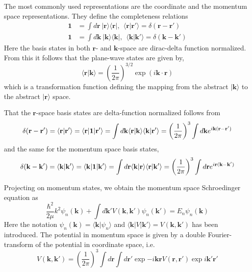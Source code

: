 \documentclass[%
oneside,                 %
final,                   %
10pt]{article}
\begin{document}
The most commonly used representations are the coordinate and
the momentum space representations. They define the completeness relations 
\begin{align*}
 \mathbf{1}&=  \int d\mathbf{r} \:\vert\mathbf{r} \rangle \langle \mathbf{r}\vert, \:\: \langle  \mathbf{r}\vert  \mathbf{r'} \rangle = \delta ( \mathbf{r}-\mathbf{r'}) \\
\mathbf{1} &= \int d\mathbf{k} \:\vert  \mathbf{k}\rangle \langle \mathbf{k}\vert, \:\: \langle\mathbf{k}\vert  \mathbf{k'} \rangle = \delta ( \mathbf{k}-\mathbf{k'}) 
\end{align*}
Here the basis states in  both $\mathbf{r}$- and $\mathbf{k}$-space are dirac-delta 
function normalized. From this it follows that the plane-wave states are given by,
\[
\langle\mathbf{r}\vert\mathbf{k} \rangle =\left(\frac{1}{2\pi}\right)^{3/2}\exp\left(i\mathbf{k\cdot r} \right)
\]
which is a transformation function defining the mapping from the abstract 
$\vert\mathbf{k}\rangle$ to the abstract $\vert\mathbf{r}\rangle $ space.

That the $\mathbf{r}$-space basis states are 
delta-function normalized follows from 
\[
\delta ( \mathbf{r}-\mathbf{r'}) = \langle \mathbf{r} \vert \mathbf{r}'\rangle = \langle \mathbf{r} \vert \mathbf{1} \vert \mathbf{r}'\rangle = \int d\mathbf{k} \langle \mathbf{r}\vert \mathbf{k} \rangle \langle \mathbf{k}\vert \mathbf{r}' \rangle =\left( {1\over 2\pi}\right)^3 \int d\mathbf{k} e^{i \mathbf{k}(\mathbf{r} - \mathbf{r}')} 
\]
and the same for the momentum space basis states,
\[
\delta ( \mathbf{k}-\mathbf{k'}) = \langle \mathbf{k} \vert \mathbf{k}'\rangle = \langle \mathbf{k} \vert \mathbf{1} \vert \mathbf{k}'\rangle =\int d\mathbf{r} \langle \mathbf{k}\vert \mathbf{r} \rangle \langle \mathbf{r}\vert \mathbf{k}' \rangle = \left( {1\over 2\pi}\right)^3 \int d\mathbf{r} e^{i \mathbf{r}(\mathbf{k} - \mathbf{k}')} 
\]

Projecting  on momentum states, we obtain the momentum space Schroedinger equation as
\begin{equation}
\frac{\hbar^2}{2\mu}k^2\psi_n(\mathbf{k})+\int d\mathbf{k'}V(\mathbf{k}, \mathbf{k'}) \psi_n(\mathbf{k'})=E_n \psi_n(\mathbf{k})
\label{eq:momspace1}
\end{equation}
Here the notation $\psi_n(\mathbf{k}) =\langle\mathbf{k}\vert\psi_n\rangle $ and 
$\langle\mathbf{k}\vert V\vert\mathbf{k}' \rangle =V(\mathbf{k}, \mathbf{k'})$ has been introduced.
The potential in momentum space is given by a double Fourier-transform 
of the potential in coordinate space, i.e.
\[ 
V(\mathbf{k},\mathbf{k'}) = \left( \frac{1}{2\pi}\right)^3\int d\mathbf{r}\int d\mathbf{r}'\exp{-i\mathbf{kr}}V(\mathbf{r},\mathbf{r}')\exp{i\mathbf{k}'\mathbf{r}'}  
\]
\end{document}
